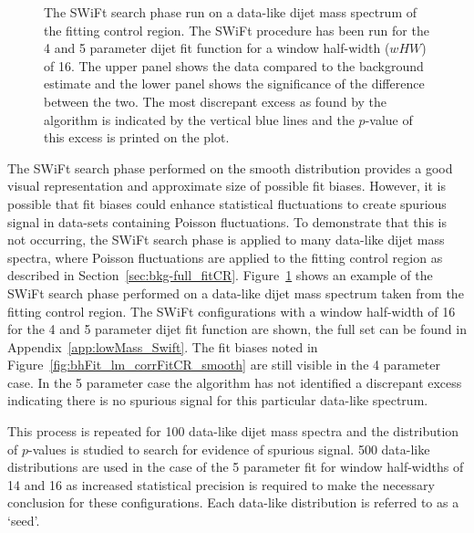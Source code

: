 \begin{figure}[!b]
\caption{\label{fig:bhFit_lm_corrFitCR_dataLike}
  The SWiFt search phase run on a data-like dijet mass spectrum of the \lm{} fitting control region.
  The SWiFt procedure has been run for the 4 and 5 parameter dijet fit function for a window half-width ($wHW$) of 16.
  The upper panel shows the data compared to the background estimate and the lower panel shows the significance of the difference between the two.
  The most discrepant excess as found by the \bh{} algorithm is indicated by the vertical blue lines and the \mbox{$p$-value} of this excess is printed on the plot. 
}
\end{figure}

The SWiFt search phase performed on the smooth distribution provides a good visual representation and approximate size of possible fit biases.
However, it is possible that fit biases could enhance statistical fluctuations to create spurious signal in data-sets containing Poisson fluctuations.
To demonstrate that this is not occurring, the SWiFt search phase is applied to many data-like dijet mass spectra,
where Poisson fluctuations are applied to the fitting control region as described in Section~\ref{sec:bkg-full_fitCR}.
Figure~\ref{fig:bhFit_lm_corrFitCR_dataLike} shows an example of the SWiFt search phase performed on a data-like dijet mass spectrum taken from the fitting control region.
The SWiFt configurations with a window half-width of 16 for the 4 and 5 parameter dijet fit function are shown, the full set can be found in Appendix~\ref{app:lowMass_Swift}.
The fit biases noted in Figure~\ref{fig:bhFit_lm_corrFitCR_smooth} are still visible in the 4 parameter case.
In the 5 parameter case the \bh{} algorithm has not identified a discrepant excess indicating
there is no spurious signal for this particular data-like spectrum.

This process is repeated for 100 data-like dijet mass spectra and the distribution of \bh{} \mbox{$p$-value}s is studied to search for evidence of spurious signal.
500 data-like distributions are used in the case of the 5 parameter fit for window half-widths of 14 and 16
as increased statistical precision is required to make the necessary conclusion for these configurations.
Each data-like distribution is referred to as a `seed'.%

